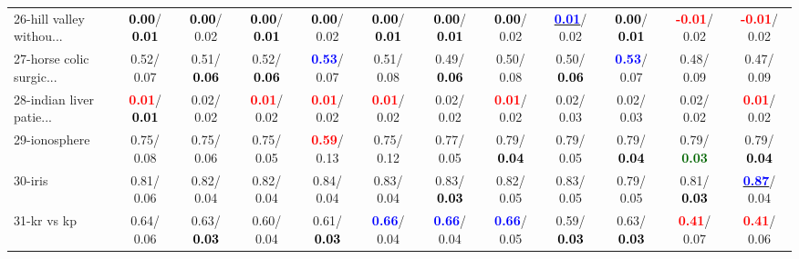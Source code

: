 \begin{table}[h]
\begin{center}
{\begin{tabular}{lc|c|c|c|c|c|c|c|c|c|c}
26-hill valley withou... & \textcolor{black}{\textbf{  0.00}}/\textcolor{black}{\textbf{  0.01}} & \textcolor{black}{\textbf{  0.00}}/  0.02 & \textcolor{black}{\textbf{  0.00}}/\textcolor{black}{\textbf{  0.01}} & \textcolor{black}{\textbf{  0.00}}/  0.02 & \textcolor{black}{\textbf{  0.00}}/\textcolor{black}{\textbf{  0.01}} & \textcolor{black}{\textbf{  0.00}}/\textcolor{black}{\textbf{  0.01}} & \textcolor{black}{\textbf{  0.00}}/  0.02 & \underline{\textcolor{blue}{\textbf{  0.01}}}/  0.02 & \textcolor{black}{\textbf{  0.00}}/\textcolor{black}{\textbf{  0.01}} & \textcolor{red}{\textbf{ -0.01}}/  0.02 & \textcolor{red}{\textbf{ -0.01}}/  0.02 \\
27-horse colic surgic... &   0.52/  0.07 &   0.51/\textcolor{black}{\textbf{  0.06}} &   0.52/\textcolor{black}{\textbf{  0.06}} & \textcolor{blue}{\textbf{  0.53}}/  0.07 &   0.51/  0.08 &   0.49/\textcolor{black}{\textbf{  0.06}} &   0.50/  0.08 &   0.50/\textcolor{black}{\textbf{  0.06}} & \textcolor{blue}{\textbf{  0.53}}/  0.07 &   0.48/  0.09 &   0.47/  0.09 \\
28-indian liver patie... & \textcolor{red}{\textbf{  0.01}}/\textcolor{black}{\textbf{  0.01}} &   0.02/  0.02 & \textcolor{red}{\textbf{  0.01}}/  0.02 & \textcolor{red}{\textbf{  0.01}}/  0.02 & \textcolor{red}{\textbf{  0.01}}/  0.02 &   0.02/  0.02 & \textcolor{red}{\textbf{  0.01}}/  0.02 &   0.02/  0.03 &   0.02/  0.03 &   0.02/  0.02 & \textcolor{red}{\textbf{  0.01}}/  0.02 \\ \hline
29-ionosphere &   0.75/  0.08 &   0.75/  0.06 &   0.75/  0.05 & \textcolor{red}{\textbf{  0.59}}/  0.13 &   0.75/  0.12 &   0.77/  0.05 &   0.79/\textcolor{black}{\textbf{  0.04}} &   0.79/  0.05 &   0.79/\textcolor{black}{\textbf{  0.04}} &   0.79/\textcolor{darkgreen}{\textbf{  0.03}} &   0.79/\textcolor{black}{\textbf{  0.04}} \\
30-iris &   0.81/  0.06 &   0.82/  0.04 &   0.82/  0.04 &   0.84/  0.04 &   0.83/  0.04 &   0.83/\textcolor{black}{\textbf{  0.03}} &   0.82/  0.05 &   0.83/  0.05 &   0.79/  0.05 &   0.81/\textcolor{black}{\textbf{  0.03}} & \underline{\textcolor{blue}{\textbf{  0.87}}}/  0.04 \\
31-kr vs kp &   0.64/  0.06 &   0.63/\textcolor{black}{\textbf{  0.03}} &   0.60/  0.04 &   0.61/\textcolor{black}{\textbf{  0.03}} & \textcolor{blue}{\textbf{  0.66}}/  0.04 & \textcolor{blue}{\textbf{  0.66}}/  0.04 & \textcolor{blue}{\textbf{  0.66}}/  0.05 &   0.59/\textcolor{black}{\textbf{  0.03}} &   0.63/\textcolor{black}{\textbf{  0.03}} & \textcolor{red}{\textbf{  0.41}}/  0.07 & \textcolor{red}{\textbf{  0.41}}/  0.06 \\

\end{tabular}}
\end{center}
\end{table}
